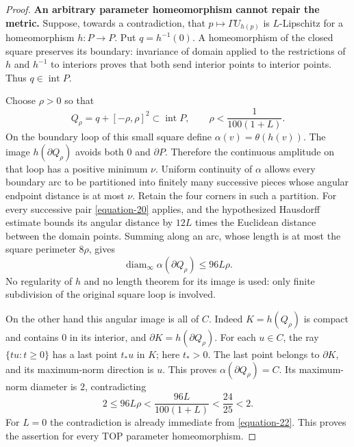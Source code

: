 \documentclass[11pt,a4paper]{article}
\theoremstyle{definition}
\begin{document}
\begin{proof}
\textbf{An arbitrary parameter homeomorphism cannot repair the metric.}
Suppose, towards a contradiction, that
$p\mapsto\Gamma U_{h(p)}$ is $L$-Lipschitz for a homeomorphism
$h:P\to P$. Put $q=h^{-1}(0)$. A homeomorphism of the closed square
preserves its boundary: invariance of domain applied to the
restrictions of $h$ and $h^{-1}$ to interiors proves that both
send interior points to interior points. Thus $q\in\operatorname{int}P$.

Choose $\rho>0$ so that
\begin{equation}
 Q_\rho=q+[-\rho,\rho]^2\subset\operatorname{int}P,\qquad
                    \rho<\frac{1}{100(1+L)}.
 \label{equation-21}
\end{equation}
On the boundary loop of this small square define
$\alpha(v)=\theta(h(v))$. The image $h(\partial Q_\rho)$ avoids both $0$ and
$\partial P$. Therefore the continuous amplitude on that loop
has a positive minimum $\nu$. Uniform continuity of $\alpha$
allows every boundary arc to be partitioned into finitely many
successive pieces whose angular endpoint distance is at most
$\nu$. Retain the four corners in such a partition.
For every successive pair \eqref{equation-20} applies, and the hypothesized
Hausdorff estimate bounds its angular distance by
$12L$ times the Euclidean distance between the domain points.
Summing along an arc, whose length is at most the square perimeter
$8\rho$, gives
\begin{equation}
                   \operatorname{diam}_\infty\alpha(\partial Q_\rho)
                                      \le96L\rho.
 \label{equation-22}
\end{equation}
No regularity of $h$ and no length theorem for its image is used:
only finite subdivision of the original square loop is involved.

On the other hand this angular image is all of $C$.
Indeed $K=h(Q_\rho)$ is compact and contains $0$ in its interior,
and $\partial K=h(\partial Q_\rho)$. For each $u\in C$, the ray
$\{tu:t\ge0\}$ has a last point $t_*u$ in $K$; here $t_*>0$.
The last point belongs to $\partial K$, and its maximum-norm
direction is $u$. This proves $\alpha(\partial Q_\rho)=C$.
Its maximum-norm diameter is $2$, contradicting
\begin{equation}
      2\le96L\rho<
             \frac{96L}{100(1+L)}<\frac{24}{25}<2.
 \label{equation-23}
\end{equation}
For $L=0$ the contradiction is already immediate from \eqref{equation-22}.
This proves the assertion for every TOP parameter homeomorphism.


\end{proof}
\end{document}
